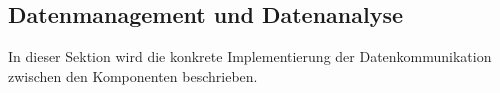 \subsection{Datenmanagement und Datenanalyse}
\label{subsec:datenmanagementimpl}

In dieser Sektion wird die konkrete Implementierung der Datenkommunikation zwischen den Komponenten beschrieben.




